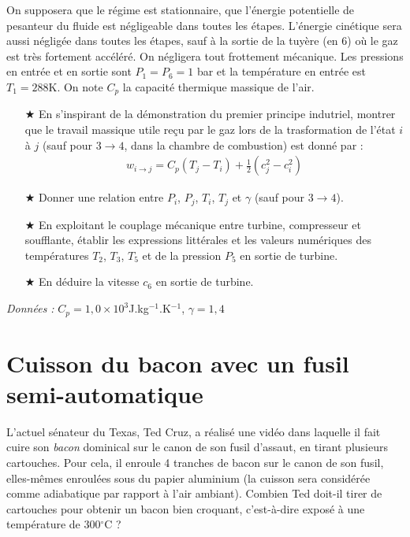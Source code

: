 \documentclass{report}
\begin{document}
On supposera que le régime est stationnaire, que l'énergie potentielle de pesanteur du fluide est négligeable dans toutes les étapes. L'énergie cinétique sera aussi négligée dans toutes les étapes, sauf à la sortie de la tuyère (en 6) où le gaz est très fortement accéléré. On négligera tout frottement mécanique. Les pressions en entrée et en sortie sont $P_1=P_6=1$ bar et la température en entrée est $T_1=288$K. On note $C_p$ la capacité thermique massique de l'air.

\begin{itemize}

	\item[$\bigstar$] En s'inspirant de la démonstration du premier principe indutriel, montrer que le travail massique utile reçu par le gaz lors de la trasformation de l'état $i$ à $j$ (sauf pour $3\rightarrow4$, dans la chambre de combustion) est donné par :
	\begin{align*}
		w_{i\rightarrow j}=C_p(T_j-T_i) + \frac{1}{2}\left(c_j^2-c_i^2 \right) 
	\end{align*}
	
	\item[$\bigstar$] Donner une relation entre $P_i$, $P_j$, $T_i$, $T_j$ et $\gamma$ (sauf pour $3\rightarrow4$).
	\item[$\bigstar$] En exploitant le couplage mécanique entre turbine, compresseur et soufflante, établir les expressions littérales et les valeurs numériques des températures $T_2$, $T_3$, $T_5$ et de la pression $P_5$ en sortie de turbine.
	\item[$\bigstar$] En déduire la vitesse $c_6$ en sortie de turbine. 

\end{itemize}

\textit{Données :} $C_p=1,0\times10^3$J.kg$^{-1}$.K$^{-1}$, $\gamma=1,4$

\newpage

\section*{Cuisson du bacon avec un fusil semi-automatique}

L'actuel sénateur du Texas, Ted Cruz, a réalisé une vidéo dans laquelle il fait cuire son \textit{bacon} dominical sur le canon de son fusil d'assaut, en tirant plusieurs cartouches. Pour cela, il enroule 4 tranches de bacon sur le canon de son fusil, elles-mêmes enroulées sous du papier aluminium (la cuisson sera considérée comme adiabatique par rapport à l'air ambiant). Combien Ted doit-il tirer de cartouches pour obtenir un bacon bien croquant, c'est-à-dire exposé à une température de 300$^\circ$C ?
\end{document}
